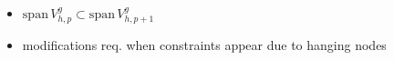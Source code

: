 \begin{frame}[c]
{\begin{figure}
	\end{figure}
	}\vspace*{-1em}
	\begin{itemize}\addtolength{\itemsep}{-.25\baselineskip}
			\item<4-> $\mathrm{span}\, V^g_{h,p} \subset \mathrm{span}\, V^g_{h,p+1}$
			\item<5-> modifications req. when constraints appear due to hanging nodes 	  	
	\end{itemize}
\end{frame}
